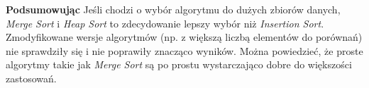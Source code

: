 \documentclass{article}
\begin{document}
	\textbf{Podsumowując } Jeśli chodzi o wybór algorytmu do dużych zbiorów danych, \textit{Merge Sort} i \textit{Heap Sort} to zdecydowanie lepszy wybór niż \textit{Insertion Sort}. Zmodyfikowane wersje algorytmów (np. z większą liczbą elementów do porównań) nie sprawdziły się i nie poprawiły znacząco wyników. Można powiedzieć, że proste algorytmy takie jak \textit{Merge Sort} są po prostu wystarczająco dobre do większości zastosowań.
	
\end{document}
